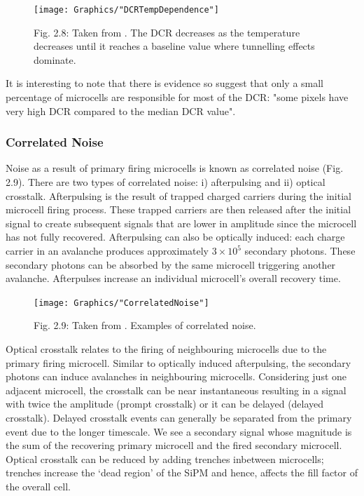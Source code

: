 \begin{figure}[h]
\texttt{[image: Graphics/"DCRTempDependence"]}
  {\caption*{Fig. 2.8: Taken from \cite{acerbi2017}. The DCR decreases as the temperature decreases until it reaches a baseline value where tunnelling effects dominate.}}
\end{figure}

\noindent It is interesting to note that there is evidence so suggest that only a small percentage of microcells are responsible for most of the DCR: "some pixels have very high DCR compared to the median DCR value". \cite{mandai2012}

\subsubsection{Correlated Noise}

Noise as a result of primary firing microcells is known as correlated noise (Fig. 2.9). There are two types of correlated noise: i) afterpulsing and ii) optical crosstalk. Afterpulsing is the result of trapped charged carriers during the initial microcell firing process. These trapped carriers are then released after the initial signal to create subsequent signals that are lower in amplitude since the microcell has not fully recovered. Afterpulsing can also be optically induced: each charge carrier in an avalanche produces approximately $3\times 10^5$ secondary photons. \cite{lacaita1993} These secondary photons can be absorbed by the same microcell triggering another avalanche. Afterpulses increase an individual microcell's overall recovery time.

\begin{figure}[h]
\texttt{[image: Graphics/"CorrelatedNoise"]}
  {\caption*{Fig. 2.9: Taken from \cite{acerbi2019}. Examples of correlated noise.}}
\end{figure}

\noindent Optical crosstalk relates to the firing of neighbouring microcells due to the primary firing microcell. Similar to optically induced afterpulsing, the secondary photons can induce avalanches in neighbouring microcells. Considering just one adjacent microcell, the crosstalk can be near instantaneous resulting in a signal with twice the amplitude (prompt crosstalk) or it can be delayed (delayed crosstalk). Delayed crosstalk events can generally be separated from the primary event due to the longer timescale. We see a secondary signal whose magnitude is the sum of the recovering primary microcell and the fired secondary microcell. Optical crosstalk can be reduced by adding trenches inbetween microcells; trenches increase the `dead region' of the SiPM and hence, affects the fill factor of the overall cell. \cite{gundacker2020}


